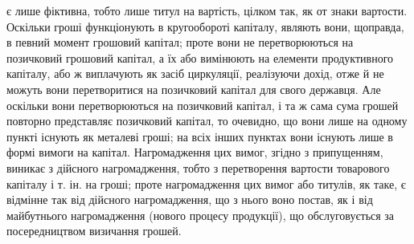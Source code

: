 \parcont{}  %
є лише фіктивна, тобто лише титул на вартість, цілком так, як от знаки
вартости. Оскільки гроші функціонують в кругообороті капіталу, являють вони,
щоправда, в певний момент грошовий капітал; проте вони не перетворюються на
позичковий грошовий капітал, а їх або вимінюють на елементи продуктивного капіталу,
або ж виплачують як засіб циркуляції, реалізуючи дохід, отже й не можуть
вони перетворитися на позичковий капітал для свого державця. Але оскільки
вони перетворюються на позичковий капітал, і та ж сама сума грошей повторно
представляє позичковий капітал, то очевидно, що вони лише на одному пункті
існують як металеві гроші; на всіх інших пунктах вони існують лише в формі
вимоги на капітал. Нагромадження цих вимог, згідно з припущенням, виникає
з дійсного нагромадження, тобто з перетворення вартости товарового капіталу
і т. ін. на гроші; проте нагромадження цих вимог або титулів, як таке, є відмінне
так від дійсного нагромадження, що з нього воно постав, як і від майбутнього
нагромадження (нового процесу продукції), що обслуговується за посередництвом
визичання грошей.


